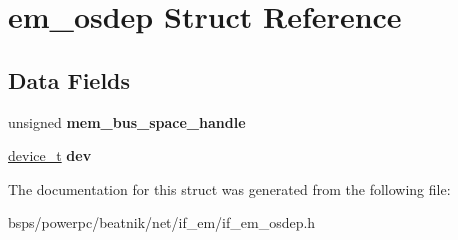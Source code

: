 \hypertarget{structem__osdep}{}\section{em\+\_\+osdep Struct Reference}
\label{structem__osdep}
\subsection*{Data Fields}
\begin{DoxyCompactItemize}
\item 
\mbox{\label{structem__osdep_a5090e3d6423c4255035d72ce794f5e8e}} 
unsigned {\bfseries mem\+\_\+bus\+\_\+space\+\_\+handle}
\item 
\mbox{\label{structem__osdep_a141187208527f6a0afc44bb54965a9f8}} 
\mbox{\hyperlink{structdevice}{device\+\_\+t}} {\bfseries dev}
\end{DoxyCompactItemize}


The documentation for this struct was generated from the following file\+:\begin{DoxyCompactItemize}
\item 
bsps/powerpc/beatnik/net/if\+\_\+em/if\+\_\+em\+\_\+osdep.\+h\end{DoxyCompactItemize}
